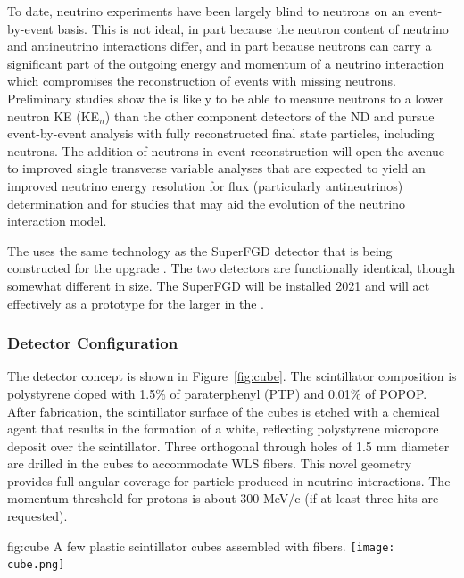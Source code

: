 To date, neutrino experiments have been largely blind to neutrons on an event-by-event basis.  This is not ideal, in part because the neutron content of neutrino and antineutrino interactions differ, and in part because neutrons can carry a significant part of the outgoing energy and momentum of a neutrino interaction which compromises the reconstruction of events with missing neutrons.  Preliminary studies show the  is likely to be able to measure neutrons to a lower neutron KE (KE$_{n}$) than the other component detectors of the ND and pursue event-by-event analysis with fully reconstructed final state particles, including neutrons. The addition of neutrons in event reconstruction will open the avenue to improved single transverse variable analyses that are expected to yield an improved neutrino energy resolution for flux (particularly antineutrinos) determination and for studies that may aid the evolution of the neutrino interaction model.

The  uses the same technology as the SuperFGD detector that is being constructed for the   upgrade \cite{Abe:2019whr}.  The two detectors are functionally identical, though somewhat different in size.  The SuperFGD will be installed 2021 and will act effectively as a prototype for the larger  in the   . 


\subsubsection{Detector Configuration}

The  detector concept is shown in Figure~\ref{fig:cube}.
The scintillator composition is polystyrene doped with 1.5\% of paraterphenyl (PTP) and 0.01\% of POPOP. After fabrication, the scintillator surface of the cubes is etched with a chemical agent that results in the formation of a white, reflecting polystyrene micropore deposit over the scintillator. Three orthogonal through holes of 1.5 mm diameter are drilled in the cubes to accommodate WLS fibers. 
This novel geometry provides full angular coverage for particle produced in neutrino interactions.  The momentum threshold for protons is about 300 MeV/c (if at least three hits are requested).



\begin{dunefigure}{fig:cube}
{A few plastic scintillator cubes assembled with  fibers.}
  \texttt{[image: cube.png]}
\end{dunefigure}

